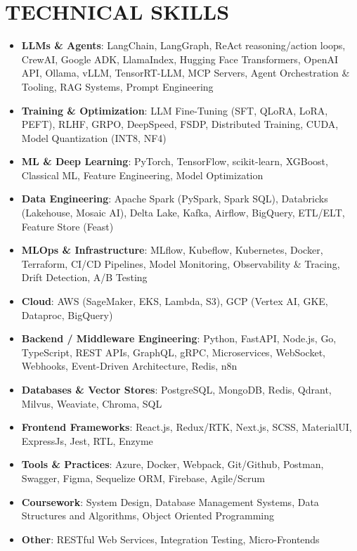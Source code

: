 \documentclass[100pt,a4paper]{article}
\begin{document}
\section*{TECHNICAL SKILLS}
\setlength{\arrayrulewidth}{1.2pt}
\begin{itemize}
\item \textbf{LLMs \& Agents}{: LangChain, LangGraph, ReAct reasoning/action loops, CrewAI, Google ADK, LlamaIndex, Hugging Face Transformers, OpenAI API, Ollama, vLLM, TensorRT-LLM, MCP Servers, Agent Orchestration \& Tooling, RAG Systems, Prompt Engineering}
\item \textbf{Training \& Optimization}{: LLM Fine-Tuning (SFT, QLoRA, LoRA, PEFT), RLHF, GRPO, DeepSpeed, FSDP, Distributed Training, CUDA, Model Quantization (INT8, NF4)}
\item \textbf{ML \& Deep Learning}{: PyTorch, TensorFlow, scikit-learn, XGBoost, Classical ML, Feature Engineering, Model Optimization}
\item \textbf{Data Engineering}{: Apache Spark (PySpark, Spark SQL), Databricks (Lakehouse, Mosaic AI), Delta Lake, Kafka, Airflow, BigQuery, ETL/ELT, Feature Store (Feast)}
\item \textbf{MLOps \& Infrastructure}{: MLflow, Kubeflow, Kubernetes, Docker, Terraform, CI/CD Pipelines, Model Monitoring, Observability \& Tracing, Drift Detection, A/B Testing}
\item \textbf{Cloud}{: AWS (SageMaker, EKS, Lambda, S3), GCP (Vertex AI, GKE, Dataproc, BigQuery)}
\item \textbf{Backend / Middleware Engineering}{: Python, FastAPI, Node.js, Go, TypeScript, REST APIs, GraphQL, gRPC, Microservices, WebSocket, Webhooks, Event-Driven Architecture, Redis, n8n}
\item \textbf{Databases \& Vector Stores}{: PostgreSQL, MongoDB, Redis, Qdrant, Milvus, Weaviate, Chroma, SQL}
\item \textbf{Frontend Frameworks}{: React.js, Redux/RTK, Next.js, SCSS, MaterialUI, ExpressJs, Jest, RTL, Enzyme}
\item \textbf{Tools \& Practices}{: Azure, Docker, Webpack, Git/Github, Postman, Swagger, Figma, Sequelize ORM, Firebase, Agile/Scrum}
\item \textbf{Coursework}{: System Design, Database Management Systems, Data Structures and Algorithms, Object Oriented Programming}
\item \textbf{Other}{: RESTful Web Services, Integration Testing, Micro-Frontends}
\end{itemize}
\end{document}
